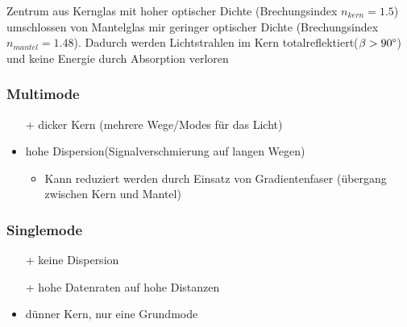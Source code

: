 Zentrum aus Kernglas mit hoher optischer Dichte (Brechungsindex $n_{kern} = 1.5$)
umschlossen von Mantelglas mir geringer optischer Dichte (Brechungsindex $n_{mantel} = 1.48$).
Dadurch werden Lichtstrahlen im Kern totalreflektiert($\beta > 90 \degree$) und keine Energie durch Absorption
verloren

\subsubsection{Multimode}
\begin{itemize}
	\item[+] dicker Kern (mehrere Wege/Modes für das Licht)
	\item hohe Dispersion(Signalverschmierung auf langen Wegen)
	      \begin{itemize}
		      \item Kann reduziert werden durch Einsatz von Gradientenfaser (übergang zwischen
		            Kern und Mantel)
	      \end{itemize}
\end{itemize}

\subsubsection{Singlemode}
\begin{itemize}
	\item[+] keine Dispersion
	\item[+] hohe Datenraten auf hohe Distanzen
	\item dünner Kern, nur eine Grundmode
\end{itemize}







